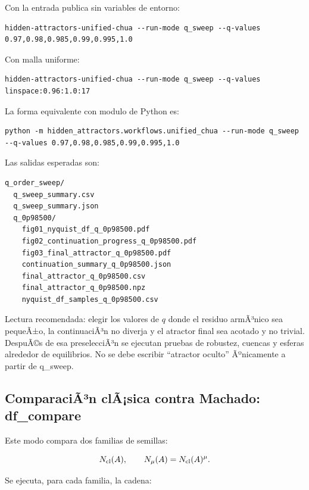\documentclass[11pt]{article}
\DeclareRobustCommand{\codepath}[1]{\begingroup\Urlmuskip=0mu plus 2mu\path{#1}\endgroup}
\def\codepath#1{#1}%
\begin{document}
Con la entrada publica sin variables de entorno:

\begin{lstlisting}
hidden-attractors-unified-chua --run-mode q_sweep --q-values 0.97,0.98,0.985,0.99,0.995,1.0
\end{lstlisting}

Con malla uniforme:

\begin{lstlisting}
hidden-attractors-unified-chua --run-mode q_sweep --q-values linspace:0.96:1.0:17
\end{lstlisting}

La forma equivalente con modulo de Python es:

\begin{lstlisting}
python -m hidden_attractors.workflows.unified_chua --run-mode q_sweep --q-values 0.97,0.98,0.985,0.99,0.995,1.0
\end{lstlisting}

Las salidas esperadas son:

\begin{lstlisting}
q_order_sweep/
  q_sweep_summary.csv
  q_sweep_summary.json
  q_0p98500/
    fig01_nyquist_df_q_0p98500.pdf
    fig02_continuation_progress_q_0p98500.pdf
    fig03_final_attractor_q_0p98500.pdf
    continuation_summary_q_0p98500.json
    final_attractor_q_0p98500.csv
    final_attractor_q_0p98500.npz
    nyquist_df_samples_q_0p98500.csv
\end{lstlisting}

Lectura recomendada: elegir los valores de \(q\) donde el residuo armÃ³nico sea pequeÃ±o, la continuaciÃ³n no diverja y el atractor final sea acotado y no trivial. DespuÃ©s de esa preselecciÃ³n se ejecutan pruebas de robustez, cuencas y esferas alrededor de equilibrios. No se debe escribir ``atractor oculto'' Ãºnicamente a partir de \codepath{q_sweep}.

\subsection[ComparaciÃ³n clÃ¡sica contra Machado: df\_compare]{ComparaciÃ³n clÃ¡sica contra Machado: \codepath{df_compare}}

Este modo compara dos familias de semillas:

\begin{equation}
N_{\rm cl}(A),
\qquad
N_{\mu}(A)=N_{\rm cl}(A)^\mu.
\end{equation}

Se ejecuta, para cada familia, la cadena:
\end{document}
